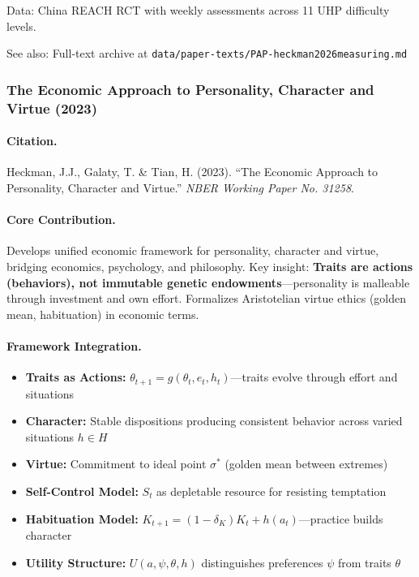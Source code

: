 Data: China REACH RCT with weekly assessments across 11 UHP difficulty levels.

See also: Full-text archive at \texttt{data/paper-texts/PAP-heckman2026measuring.md}

\subsubsection{The Economic Approach to Personality, Character and Virtue (2023)}

\paragraph{Citation.}
Heckman, J.J., Galaty, T. \& Tian, H. (2023). ``The Economic Approach to Personality,
Character and Virtue.'' \emph{NBER Working Paper No. 31258}.
\citep{heckman2023virtue}

\paragraph{Core Contribution.}
Develops unified economic framework for personality, character and virtue, bridging
economics, psychology, and philosophy. Key insight: \textbf{Traits are actions (behaviors),
not immutable genetic endowments}---personality is malleable through investment and own
effort. Formalizes Aristotelian virtue ethics (golden mean, habituation) in economic terms.

\paragraph{Framework Integration.}
\begin{itemize}
  \item \textbf{Traits as Actions:} $\theta_{t+1} = g(\theta_t, e_t, h_t)$---traits evolve
        through effort and situations
  \item \textbf{Character:} Stable dispositions producing consistent behavior across
        varied situations $h \in H$
  \item \textbf{Virtue:} Commitment to ideal point $\sigma^*$ (golden mean between extremes)
  \item \textbf{Self-Control Model:} $S_t$ as depletable resource for resisting temptation
  \item \textbf{Habituation Model:} $K_{t+1} = (1-\delta_K)K_t + h(a_t)$---practice builds
        character
  \item \textbf{Utility Structure:} $U(a, \psi, \theta, h)$ distinguishes preferences
        $\psi$ from traits $\theta$
\end{itemize}

